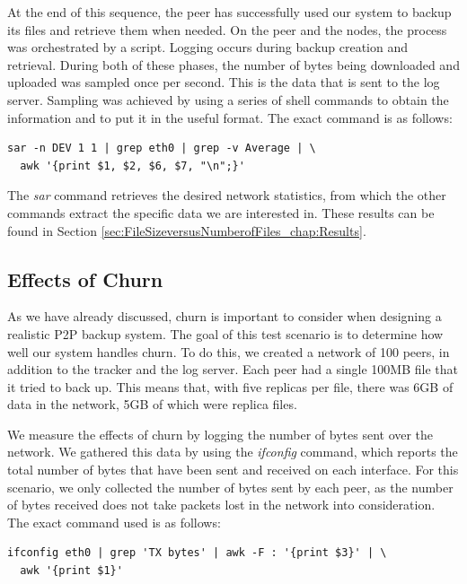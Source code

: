 \documentclass[12pt]{report}
\begin{document}
At the end of this sequence, the peer has successfully used our system to backup its files and retrieve them when needed. On the peer and the nodes, the process was orchestrated by a script. Logging occurs during backup creation and retrieval. During both of these phases, the number of bytes being downloaded and uploaded was sampled once per second. This is the data that is sent to the log server. Sampling was achieved by using a series of shell commands to obtain the information and to put it in the useful format. The exact command is as follows:

\begin{verbatim}
sar -n DEV 1 1 | grep eth0 | grep -v Average | \
  awk '{print $1, $2, $6, $7, "\n";}'
\end{verbatim}

The \textit{sar} command retrieves the desired network statistics, from which the other commands extract the specific data we are interested in. These results can be found in Section \ref{sec:FileSizeversusNumberofFiles_chap:Results}.

\subsection{Effects of Churn} \label{subsec:EffectsofChurn_sec:TestScenarios_chap:Methodology}

As we have already discussed, churn is important to consider when designing a realistic P2P backup system. The goal of this test scenario is to determine how well our system handles churn. To do this, we created a network of 100 peers, in addition to the tracker and the log server. Each peer had a single 100MB file that it tried to back up. This means that, with five replicas per file, there was 6GB of data in the network, 5GB of which were replica files.

We measure the effects of churn by logging the number of bytes sent over the network. We gathered this data by using the \textit{ifconfig} command, which reports the total number of bytes that have been sent and received on each interface. For this scenario, we only collected the number of bytes sent by each peer, as the number of bytes received does not take packets lost in the network into consideration. The exact command used is as follows:

\begin{verbatim}
ifconfig eth0 | grep 'TX bytes' | awk -F : '{print $3}' | \
  awk '{print $1}'
\end{verbatim}
\end{document}
